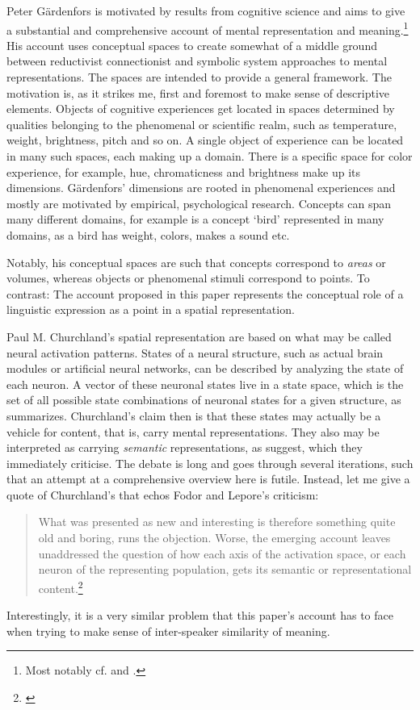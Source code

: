 \documentclass[11pt, a4paper]{scrartcl}
\renewcommand{\i}[1]{\emph{#1}}
\begin{document}
Peter Gärdenfors is motivated by results from cognitive science and aims to give a substantial and comprehensive account of mental representation and meaning.\footnote{Most notably cf. \textcite{gärdenfors2004conceptual} and \textcite{Gardenfors2014-GRDTGO}.} His account uses conceptual spaces to create somewhat of a middle ground between reductivist connectionist and symbolic system approaches to mental representations. The spaces are intended to provide a general framework. The motivation is, as it strikes me, first and foremost to make sense of descriptive elements. Objects of cognitive experiences get located in spaces determined by qualities belonging to the phenomenal or scientific realm, such as temperature, weight, brightness, pitch and so on. A single object of experience can be located in many such spaces, each making up a domain. There is a specific space for color experience, for example, hue, chromaticness and brightness make up its dimensions. Gärdenfors' dimensions are rooted in phenomenal experiences and mostly are motivated by empirical, psychological research. Concepts can span many different domains, for example is a concept `bird' represented in many domains, as a bird has weight, colors, makes a sound etc. 

Notably, his conceptual spaces are such that concepts correspond to \i{areas} or volumes, whereas objects or phenomenal stimuli correspond to points. To contrast: The account proposed in this paper represents the conceptual role of a linguistic expression as a point in a spatial representation.

Paul M. Churchland's spatial representation are based on what may be called neural activation patterns. States of a neural structure, such as actual brain modules or artificial neural networks, can be described by analyzing the state of each neuron. A vector of these neuronal states live in a state space, which is the set of all possible state combinations of neuronal states for a given structure, as \textcite{Tiffany1999-TIFSSD-4} summarizes. Churchland's claim then is that these states may actually be a vehicle for content, that is, carry mental representations. They also may be interpreted as carrying \i{semantic} representations, as \textcite{Fodor1999-FODAAS} suggest, which they immediately criticise. The debate is long and goes through several iterations, such that an attempt at a comprehensive overview here is futile. Instead, let me give a quote of Churchland's that echos Fodor and Lepore's criticism:

{\singlespacing{} 
\begin{quote}What was presented as new and interesting is therefore something quite old and boring, runs the objection. Worse, the emerging account leaves unaddressed the question of how each axis of the activation space, or each neuron of the representing population, gets its semantic or representational content.\footnote{\textcite[7]{10.2307/2564566}}
 \end{quote}
}
 Interestingly, it is a very similar problem that this paper's account has to face when trying to make sense of inter-speaker similarity of meaning.
\end{document}
